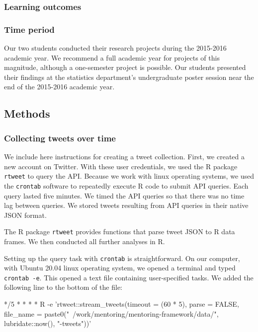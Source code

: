 \documentclass[
]{article}
\newenvironment{Shaded}{\begin{snugshade}}{\end{snugshade}}
\newcommand{\ExtensionTok}[1]{#1}
\newcommand{\NormalTok}[1]{#1}
\newcommand{\StringTok}[1]{\textcolor[rgb]{0.31,0.60,0.02}{#1}}
\begin{document}
\hypertarget{learning-outcomes}{%
\subsubsection{Learning outcomes}\label{learning-outcomes}}

\hypertarget{time-period}{%
\subsubsection{Time period}\label{time-period}}

Our two students conducted their research projects during the 2015-2016
academic year. We recommend a full academic year for projects of this
magnitude, although a one-semester project is possible. Our students
presented their findings at the statistics department's undergraduate
poster session near the end of the 2015-2016 academic year.

\hypertarget{methods}{%
\subsection{Methods}\label{methods}}

\hypertarget{collecting-tweets-over-time}{%
\subsubsection{Collecting tweets over
time}\label{collecting-tweets-over-time}}

We include here instructions for creating a tweet collection. First, we
created a new account on Twitter. With these user credentials, we used
the R package \texttt{rtweet} to query the API. Because we work with
linux operating systems, we used the \texttt{crontab} software to
repeatedly execute R code to submit API queries. Each query lasted five
minutes. We timed the API queries so that there was no time lag between
queries. We stored tweets resulting from API queries in their native
JSON format.

The R package \texttt{rtweet} provides functions that parse tweet JSON
to R data frames. We then conducted all further analyses in R.

Setting up the query task with \texttt{crontab} is straightforward. On
our computer, with Ubuntu 20.04 linux operating system, we opened a
terminal and typed \texttt{crontab\ -e}. This opened a text file
containing user-specified tasks. We added the following line to the
bottom of the file:

\begin{Shaded}
\begin{Highlighting}[]
\ExtensionTok{*/5}\NormalTok{ * * * * R -e }\StringTok{'rtweet::stream_tweets(timeout = (60 * 5), }
\StringTok{parse = FALSE, file_name = paste0("~/work/mentoring/mentoring-framework/data/",}
\StringTok{lubridate::now(), "-tweets"))'}
\end{Highlighting}
\end{Shaded}
\end{document}
